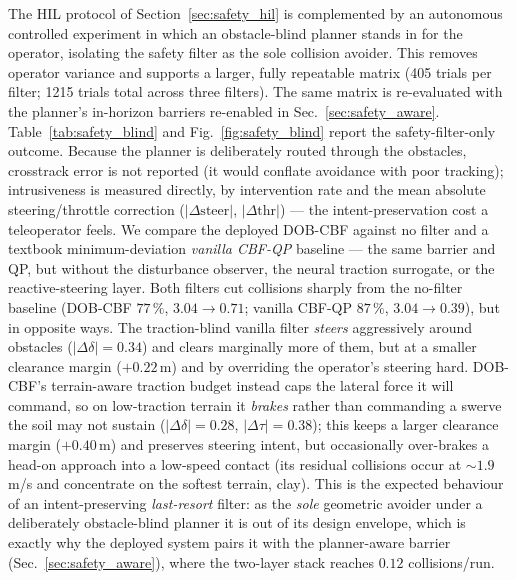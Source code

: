 \documentclass[conference,letterpaper,10pt]{IEEEtran}
\begin{document}
The HIL protocol of Section~\ref{sec:safety_hil} is complemented by
an autonomous controlled experiment in which an obstacle-blind planner
stands in for the operator, isolating the safety filter as the sole collision
avoider. This
removes operator variance and supports a larger, fully repeatable
matrix (405 trials per filter; 1215 trials total across three filters).
The same matrix is re-evaluated with the planner's in-horizon barriers
re-enabled in Sec.~\ref{sec:safety_aware}.
Table~\ref{tab:safety_blind} and Fig.~\ref{fig:safety_blind} report the
safety-filter-only outcome. Because the planner is deliberately routed through the obstacles,
crosstrack error is not reported (it would conflate avoidance with poor
tracking); intrusiveness is measured directly, by intervention rate and
the mean absolute steering/throttle correction ($|\Delta\mathrm{steer}|$,
$|\Delta\mathrm{thr}|$) --- the intent-preservation cost a teleoperator
feels. We compare the deployed DOB-CBF against no
filter and a textbook minimum-deviation \emph{vanilla CBF-QP} baseline --- the
same barrier and QP, but without the disturbance observer, the neural traction
surrogate, or the reactive-steering layer. Both filters cut collisions sharply
from the no-filter baseline (DOB-CBF $77\,\%$, $3.04\!\to\!0.71$; vanilla
CBF-QP $87\,\%$, $3.04\!\to\!0.39$), but in opposite ways. The traction-blind
vanilla filter \emph{steers} aggressively around obstacles
($|\Delta\delta|\!=\!0.34$) and clears marginally more of them, but at a
smaller clearance margin ($+0.22\,$m) and by overriding the operator's steering
hard. DOB-CBF's terrain-aware traction budget instead caps the lateral force it
will command, so on low-traction terrain it \emph{brakes} rather than
commanding a swerve the soil may not sustain ($|\Delta\delta|\!=\!0.28$,
$|\Delta\tau|\!=\!0.38$); this keeps a larger clearance margin ($+0.40\,$m) and
preserves steering intent, but occasionally over-brakes a head-on approach into
a low-speed contact (its residual collisions occur at $\sim\!1.9\,$m/s and
concentrate on the softest terrain, clay). This is the expected behaviour of an
intent-preserving \emph{last-resort} filter: as the \emph{sole} geometric
avoider under a deliberately obstacle-blind planner it is out of its design
envelope, which is exactly why the deployed system pairs it with the
planner-aware barrier (Sec.~\ref{sec:safety_aware}), where the two-layer stack
reaches $0.12$ collisions/run.
\end{document}
